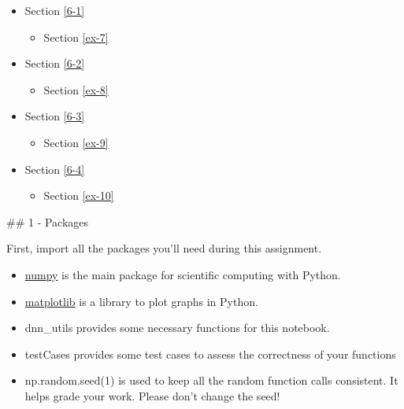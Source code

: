 \documentclass[11pt]{article}
\providecommand{\tightlist}{%
      \setlength{\itemsep}{0pt}\setlength{\parskip}{0pt}}
\begin{document}
\begin{itemize}
  \begin{itemize}
  \tightlist
  \item
    Section \ref{6-1}

    \begin{itemize}
    \tightlist
    \item
      Section \ref{ex-7}
    \end{itemize}
  \item
    Section \ref{6-2}

    \begin{itemize}
    \tightlist
    \item
      Section \ref{ex-8}
    \end{itemize}
  \item
    Section \ref{6-3}

    \begin{itemize}
    \tightlist
    \item
      Section \ref{ex-9}
    \end{itemize}
  \item
    Section \ref{6-4}

    \begin{itemize}
    \tightlist
    \item
      Section \ref{ex-10}
    \end{itemize}
  \end{itemize}
\end{itemize}

    \#\# 1 - Packages

First, import all the packages you'll need during this assignment.

\begin{itemize}
\tightlist
\item
  \href{www.numpy.org}{numpy} is the main package for scientific
  computing with Python.
\item
  \href{http://matplotlib.org}{matplotlib} is a library to plot graphs
  in Python.
\item
  dnn\_utils provides some necessary functions for this notebook.
\item
  testCases provides some test cases to assess the correctness of your
  functions
\item
  np.random.seed(1) is used to keep all the random function calls
  consistent. It helps grade your work. Please don't change the seed!
\end{itemize}
\end{document}
